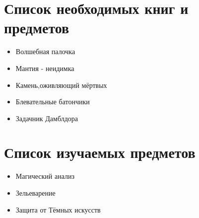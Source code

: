 \documentclass[12pt,a4paper]{book}
\begin{document}
\newpage

\section{Список необходимых книг и предметов}
\begin{itemize}
\item Волшебная палочка
\item Мантия - неидимка
\item Камень,оживляющий мёртвых
\item Блевательные батончики
\item Задачник Дамблдора
\end{itemize}
\newpage
\section{Список изучаемых предметов}
\begin{itemize}
\item Магический анализ
\item Зельеварение
\item Защита от Тёмных искусств
\end{itemize}
\end{document}
